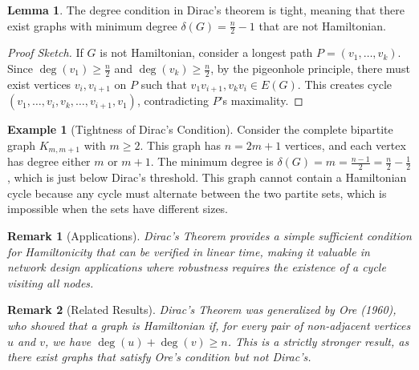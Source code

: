 \documentclass{article}
\newtheorem{remark}{Remark}
\theoremstyle{definition}
\newtheorem{example}{Example}
\newtheorem{lemma}{Lemma}
\begin{document}
\begin{lemma}
The degree condition in Dirac's theorem is tight, meaning that there exist graphs with minimum degree $\delta(G) = \frac{n}{2} - 1$ that are not Hamiltonian.
\end{lemma}
\begin{proof}[Proof Sketch]
If $G$ is not Hamiltonian, consider a longest path $P = (v_1, \ldots, v_k)$. Since $\deg(v_1) \geq \frac{n}{2}$ and $\deg(v_k) \geq \frac{n}{2}$, by the pigeonhole principle, there must exist vertices $v_i, v_{i+1}$ on $P$ such that $v_1v_{i+1}, v_kv_i \in E(G)$. This creates cycle $(v_1, \ldots, v_i, v_k, \ldots, v_{i+1}, v_1)$, contradicting $P$'s maximality.
\end{proof}
\begin{example}[Tightness of Dirac's Condition]
Consider the complete bipartite graph $K_{m,m+1}$ with $m \geq 2$. This graph has $n = 2m+1$ vertices, and each vertex has degree either $m$ or $m+1$. The minimum degree is $\delta(G) = m = \frac{n-1}{2} = \frac{n}{2} - \frac{1}{2}$, which is just below Dirac's threshold. This graph cannot contain a Hamiltonian cycle because any cycle must alternate between the two partite sets, which is impossible when the sets have different sizes.
\end{example}
\begin{remark}[Applications]
Dirac's Theorem provides a simple sufficient condition for Hamiltonicity that can be verified in linear time, making it valuable in network design applications where robustness requires the existence of a cycle visiting all nodes.
\end{remark}
\begin{remark}[Related Results]
Dirac's Theorem was generalized by Ore (1960), who showed that a graph is Hamiltonian if, for every pair of non-adjacent vertices $u$ and $v$, we have $\deg(u) + \deg(v) \geq n$. This is a strictly stronger result, as there exist graphs that satisfy Ore's condition but not Dirac's.
\end{remark}
\end{document}

